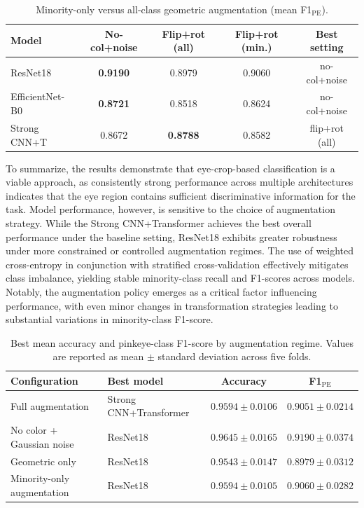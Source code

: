 \documentclass[preprint,12pt,authoryear]{elsarticle}
\begin{document}
\begin{table}
\scriptsize
  \caption{Minority-only versus all-class geometric augmentation
    (mean F1$_{\mathrm{PE}}$).}
  \label{tab:ablation_minority}
  \centering
  \setlength{\tabcolsep}{4pt}
  \begin{tabular}{lcccc}
    \toprule
    \textbf{Model}
      & \textbf{No-col+noise}
      & \textbf{Flip+rot (all)}
      & \textbf{Flip+rot (min.)}
      & \textbf{Best setting} \\
    \midrule
    ResNet18
      & \textbf{0.9190} & 0.8979 & 0.9060 & no-col+noise \\
    EfficientNet-B0
      & \textbf{0.8721} & 0.8518 & 0.8624 & no-col+noise \\
    Strong CNN+T
      & 0.8672 & \textbf{0.8788} & 0.8582 & flip+rot (all) \\
    \bottomrule
  \end{tabular}
\end{table}


To summarize, the results demonstrate that eye-crop-based classification is a viable approach, as consistently strong performance across multiple architectures indicates that the eye region contains sufficient discriminative information for the task. Model performance, however, is sensitive to the choice of augmentation strategy. While the Strong CNN+Transformer achieves the best overall performance under the baseline setting, ResNet18 exhibits greater robustness under more constrained or controlled augmentation regimes. The use of weighted cross-entropy in conjunction with stratified cross-validation effectively mitigates class imbalance, yielding stable minority-class recall and F1-scores across models. Notably, the augmentation policy emerges as a critical factor influencing performance, with even minor changes in transformation strategies leading to substantial variations in minority-class F1-score.

\begin{table}[t]
\centering
\caption{Best mean accuracy and pinkeye-class F1-score by augmentation regime. Values are reported as mean $\pm$ standard deviation across five folds.}
\label{tab:full_comparison}
\begin{tabular}{llcc}
\toprule
\textbf{Configuration} & \textbf{Best model} & \textbf{Accuracy} & \textbf{F1$_{\mathrm{PE}}$} \\
\midrule
Full augmentation & Strong CNN+Transformer & $0.9594 \pm 0.0106$ & $0.9051 \pm 0.0214$ \\
No color + Gaussian noise & ResNet18 & $0.9645 \pm 0.0165$ & $0.9190 \pm 0.0374$ \\
Geometric only & ResNet18 & $0.9543 \pm 0.0147$ & $0.8979 \pm 0.0312$ \\
Minority-only augmentation & ResNet18 & $0.9594 \pm 0.0105$ & $0.9060 \pm 0.0282$ \\
\bottomrule
\end{tabular}
\end{table}
\end{document}
